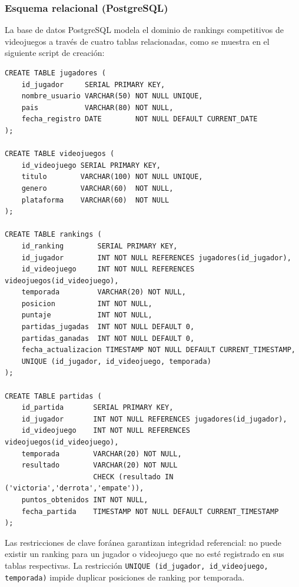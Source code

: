 \documentclass[12pt,letterpaper]{article}
\begin{document}
\subsubsection{Esquema relacional (PostgreSQL)}

La base de datos PostgreSQL modela el dominio de rankings competitivos de videojuegos
a través de cuatro tablas relacionadas, como se muestra en el siguiente script de creación:

\begin{lstlisting}[style=sqlcode, caption={Definición de tablas en PostgreSQL (\texttt{init\_postgres.sql})}]
CREATE TABLE jugadores (
    id_jugador     SERIAL PRIMARY KEY,
    nombre_usuario VARCHAR(50) NOT NULL UNIQUE,
    pais           VARCHAR(80) NOT NULL,
    fecha_registro DATE        NOT NULL DEFAULT CURRENT_DATE
);

CREATE TABLE videojuegos (
    id_videojuego SERIAL PRIMARY KEY,
    titulo        VARCHAR(100) NOT NULL UNIQUE,
    genero        VARCHAR(60)  NOT NULL,
    plataforma    VARCHAR(60)  NOT NULL
);

CREATE TABLE rankings (
    id_ranking        SERIAL PRIMARY KEY,
    id_jugador        INT NOT NULL REFERENCES jugadores(id_jugador),
    id_videojuego     INT NOT NULL REFERENCES videojuegos(id_videojuego),
    temporada         VARCHAR(20) NOT NULL,
    posicion          INT NOT NULL,
    puntaje           INT NOT NULL,
    partidas_jugadas  INT NOT NULL DEFAULT 0,
    partidas_ganadas  INT NOT NULL DEFAULT 0,
    fecha_actualizacion TIMESTAMP NOT NULL DEFAULT CURRENT_TIMESTAMP,
    UNIQUE (id_jugador, id_videojuego, temporada)
);

CREATE TABLE partidas (
    id_partida       SERIAL PRIMARY KEY,
    id_jugador       INT NOT NULL REFERENCES jugadores(id_jugador),
    id_videojuego    INT NOT NULL REFERENCES videojuegos(id_videojuego),
    temporada        VARCHAR(20) NOT NULL,
    resultado        VARCHAR(20) NOT NULL
                     CHECK (resultado IN ('victoria','derrota','empate')),
    puntos_obtenidos INT NOT NULL,
    fecha_partida    TIMESTAMP NOT NULL DEFAULT CURRENT_TIMESTAMP
);
\end{lstlisting}

Las restricciones de clave foránea garantizan integridad referencial: no puede existir un
ranking para un jugador o videojuego que no esté registrado en sus tablas respectivas.
La restricción \texttt{UNIQUE (id\_jugador, id\_videojuego, temporada)} impide duplicar
posiciones de ranking por temporada.
\end{document}
